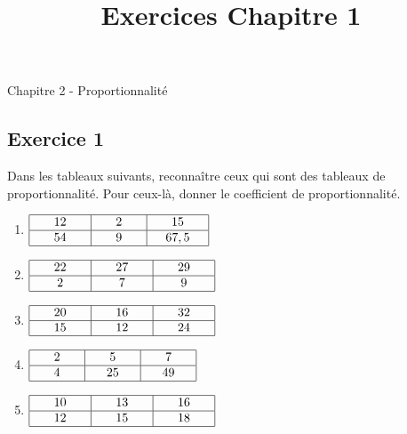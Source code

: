 \documentclass[12 pt]{extarticle}
\title{Exercices Chapitre 1}
\date{}
\theoremstyle{plain}
\begin{document}
\begin{center}{\Large Chapitre 2 - Proportionnalité}\\
 \end{center} 

\subsection*{Exercice 1}

Dans les tableaux suivants, reconnaître ceux qui sont des tableaux de proportionnalité. Pour ceux-là, donner le coefficient de proportionnalité. 

\begin{enumerate}
\item $
\begin{array}{|c|c|c|}
\hline
\phantom{000}    12    \phantom{000} 
& \phantom{000}    2   \phantom{000} & 
\phantom{000}
15
\phantom{000}\\
\hline

54 & 9  & 67,5\\
\hline
\end{array}$

\item $
\begin{array}{|c|c|c|}
\hline
\phantom{000}    22   \phantom{000} 
& \phantom{000}   27    \phantom{000} & 
\phantom{000}29
\phantom{000}\\
\hline
2 &7  & 9\\
\hline
\end{array}$

\item $
\begin{array}{|c|c|c|}
\hline
\phantom{000}    20    \phantom{000} 
& \phantom{000}     16  \phantom{000} & 
\phantom{000}
32
\phantom{000}\\
\hline

 15 & 12 & 24 \\
\hline
\end{array}$

\item $
\begin{array}{|c|c|c|}
\hline
\phantom{000}    2    \phantom{000} 
& \phantom{000}     5  \phantom{000} & 
\phantom{000}
7
\phantom{000}\\
\hline

4 & 25 & 49 \\
\hline
\end{array}$

\item $
\begin{array}{|c|c|c|}
\hline
\phantom{000}    10    \phantom{000} 
& \phantom{000}   13    \phantom{000} & 
\phantom{000}16
\phantom{000}\\
\hline
12 &15  & 18\\
\hline
\end{array}$


\end{enumerate}
\end{document}
